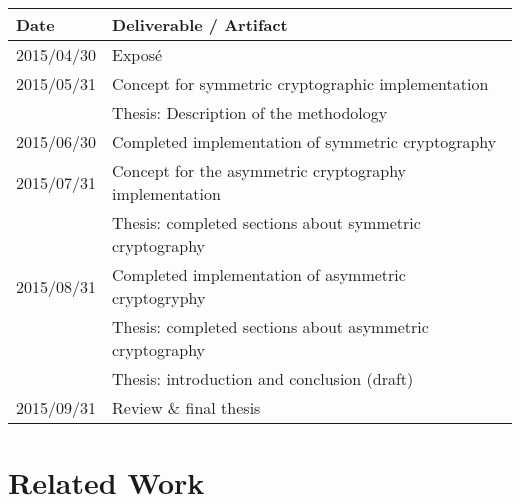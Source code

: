 \documentclass[a4paper,12pt]{article}
\begin{document}
\begin{table}[h]
\begin{tabular}{ll}
\textbf{Date} & \textbf{Deliverable / Artifact}                                           \\ \hline
2015/04/30    & Exposé                                                                    \\ \hline
2015/05/31    & Concept for symmetric cryptographic implementation                        \\
              & Thesis: Description of the methodology                                    \\ \hline
2015/06/30    & Completed implementation of symmetric cryptography                        \\ \hline
2015/07/31    & Concept for the asymmetric cryptography implementation                    \\
              & Thesis: completed sections about symmetric cryptography                   \\ \hline
2015/08/31    & Completed implementation of asymmetric cryptogryphy                       \\
              & Thesis: completed sections about asymmetric cryptography                  \\
              & Thesis: introduction and conclusion (draft)                               \\ \hline
2015/09/31    & Review \& final thesis                                                   
\end{tabular}
\end{table}

\section{Related Work}

\begingroup
\renewcommand{\section}[2]{}
\renewcommand{\refname}{}
\nocite{*}


\endgroup
\end{document}
